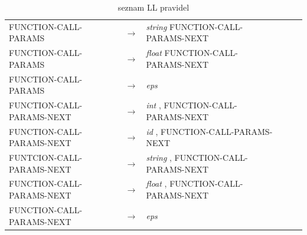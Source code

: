 \documentclass[12pt, a4paper]{article}
\begin{document}
\begin{table}[ht]
\begin{center}
\begin{tabular}{| l c l | l c l |}
	FUNCTION-CALL-PARAMS & $\longrightarrow$ & \emph{string} FUNCTION-CALL-PARAMS-NEXT \\
	FUNCTION-CALL-PARAMS & $\longrightarrow$ & \emph{float} FUNCTION-CALL-PARAMS-NEXT \\
	FUNCTION-CALL-PARAMS & $\longrightarrow$ & \emph{eps} \\
	\hline
	FUNCTION-CALL-PARAMS-NEXT & $\longrightarrow$ & \emph{int} , FUNCTION-CALL-PARAMS-NEXT \\
	FUNCTION-CALL-PARAMS-NEXT & $\longrightarrow$ & \emph{id} , FUNCTION-CALL-PARAMS-NEXT \\ 
	FUNTCION-CALL-PARAMS-NEXT & $\longrightarrow$ & \emph{string} , FUNCTION-CALL-PARAMS-NEXT \\
	FUNCTION-CALL-PARAMS-NEXT & $\longrightarrow$ & \emph{float} ,  FUNCTION-CALL-PARAMS-NEXT \\
	FUNCTION-CALL-PARAMS-NEXT & $\longrightarrow$ & \emph{eps} \\
	\hline
	\end{tabular}
	\caption{seznam LL pravidel} \label{tabulka}
	\end{center}
\end{table}
\end{document}
